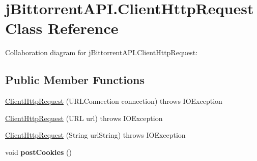 \hypertarget{classj_bittorrent_a_p_i_1_1_client_http_request}{
\section{jBittorrentAPI.ClientHttpRequest Class Reference}
\label{classj_bittorrent_a_p_i_1_1_client_http_request}
}
Collaboration diagram for jBittorrentAPI.ClientHttpRequest:\subsection*{Public Member Functions}
\begin{DoxyCompactItemize}
\item 
\hyperlink{classj_bittorrent_a_p_i_1_1_client_http_request_aa135f047107fd0feb72f5080913f50c3}{ClientHttpRequest} (URLConnection connection)  throws IOException 
\item 
\hyperlink{classj_bittorrent_a_p_i_1_1_client_http_request_a4a6d962f3543397549d6243c26ec457b}{ClientHttpRequest} (URL url)  throws IOException 
\item 
\hyperlink{classj_bittorrent_a_p_i_1_1_client_http_request_aa4b05fd63a277d7b8c3a884621ee49e7}{ClientHttpRequest} (String urlString)  throws IOException 
\item 
\hypertarget{classj_bittorrent_a_p_i_1_1_client_http_request_af77f01021b4bcb25bf0cb64f945e2762}{
void {\bfseries postCookies} ()}
\label{classj_bittorrent_a_p_i_1_1_client_http_request_af77f01021b4bcb25bf0cb64f945e2762}


\end{DoxyCompactItemize}
